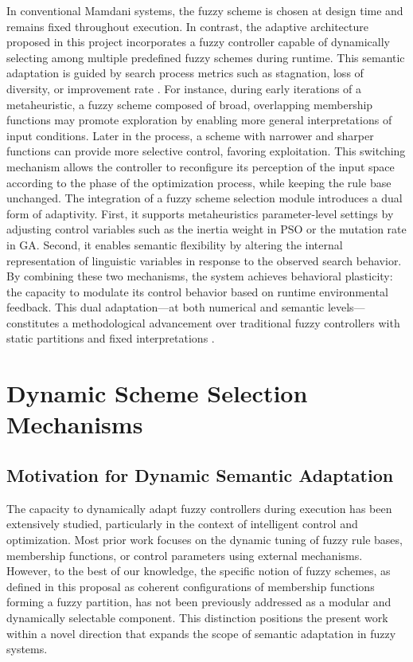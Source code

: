 In conventional Mamdani systems, the fuzzy scheme is chosen at design time and remains fixed throughout execution. In contrast, the adaptive architecture proposed in this project incorporates a fuzzy controller capable of dynamically selecting among multiple predefined fuzzy schemes during runtime. This semantic adaptation is guided by search process metrics such as stagnation, loss of diversity, or improvement rate \parencite{valdez2014survey, diaz2017new}.
For instance, during early iterations of a metaheuristic, a fuzzy scheme composed of broad, overlapping membership functions may promote exploration by enabling more general interpretations of input conditions. Later in the process, a scheme with narrower and sharper functions can provide more selective control, favoring exploitation. This switching mechanism allows the controller to reconfigure its perception of the input space according to the phase of the optimization process, while keeping the rule base unchanged.
The integration of a fuzzy scheme selection module introduces a dual form of adaptivity. First, it supports metaheuristics parameter-level settings by adjusting control variables such as the inertia weight in PSO or the mutation rate in GA. Second, it enables semantic flexibility by altering the internal representation of linguistic variables in response to the observed search behavior. By combining these two mechanisms, the system achieves behavioral plasticity: the capacity to modulate its control behavior based on runtime environmental feedback. This dual adaptation—at both numerical and semantic levels—constitutes a methodological advancement over traditional fuzzy controllers with static partitions and fixed interpretations \parencite{wang2023fuzzy, aliev2025type, xiao2019membership}.






\section{Dynamic Scheme Selection Mechanisms}


\subsection{Motivation for Dynamic Semantic Adaptation}
The capacity to dynamically adapt fuzzy controllers during execution has been extensively studied, particularly in the context of intelligent control and optimization. Most prior work focuses on the dynamic tuning of fuzzy rule bases, membership functions, or control parameters using external mechanisms. However, to the best of our knowledge, the specific notion of fuzzy schemes, as defined in this proposal as coherent configurations of membership functions forming a fuzzy partition, has not been previously addressed as a modular and dynamically selectable component. This distinction positions the present work within a novel direction that expands the scope of semantic adaptation in fuzzy systems.

